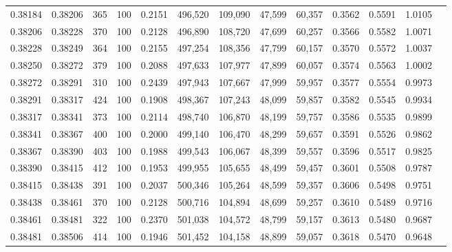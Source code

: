 \begin{tabular}{rrrrrrrrrrrrr}
0.38184 & 0.38206 &    365 & 100 &                                     0.2151 & 496,520 & 109,090 &  47,599 &  60,357 & 0.3562 & 0.5591 & 1.0105 \\
0.38206 & 0.38228 &    370 & 100 &                                     0.2128 & 496,890 & 108,720 &  47,699 &  60,257 & 0.3566 & 0.5582 & 1.0071 \\
0.38228 & 0.38249 &    364 & 100 &                                     0.2155 & 497,254 & 108,356 &  47,799 &  60,157 & 0.3570 & 0.5572 & 1.0037 \\
0.38250 & 0.38272 &    379 & 100 &                                     0.2088 & 497,633 & 107,977 &  47,899 &  60,057 & 0.3574 & 0.5563 & 1.0002 \\
0.38272 & 0.38291 &    310 & 100 &                                     0.2439 & 497,943 & 107,667 &  47,999 &  59,957 & 0.3577 & 0.5554 & 0.9973 \\
0.38291 & 0.38317 &    424 & 100 &                                     0.1908 & 498,367 & 107,243 &  48,099 &  59,857 & 0.3582 & 0.5545 & 0.9934 \\
0.38317 & 0.38341 &    373 & 100 &                                     0.2114 & 498,740 & 106,870 &  48,199 &  59,757 & 0.3586 & 0.5535 & 0.9899 \\
0.38341 & 0.38367 &    400 & 100 &                                     0.2000 & 499,140 & 106,470 &  48,299 &  59,657 & 0.3591 & 0.5526 & 0.9862 \\
0.38367 & 0.38390 &    403 & 100 &                                     0.1988 & 499,543 & 106,067 &  48,399 &  59,557 & 0.3596 & 0.5517 & 0.9825 \\
0.38390 & 0.38415 &    412 & 100 &                                     0.1953 & 499,955 & 105,655 &  48,499 &  59,457 & 0.3601 & 0.5508 & 0.9787 \\
0.38415 & 0.38438 &    391 & 100 &                                     0.2037 & 500,346 & 105,264 &  48,599 &  59,357 & 0.3606 & 0.5498 & 0.9751 \\
0.38438 & 0.38461 &    370 & 100 &                                     0.2128 & 500,716 & 104,894 &  48,699 &  59,257 & 0.3610 & 0.5489 & 0.9716 \\
0.38461 & 0.38481 &    322 & 100 &                                     0.2370 & 501,038 & 104,572 &  48,799 &  59,157 & 0.3613 & 0.5480 & 0.9687 \\
0.38481 & 0.38506 &    414 & 100 &                                     0.1946 & 501,452 & 104,158 &  48,899 &  59,057 & 0.3618 & 0.5470 & 0.9648 \\

\end{tabular}
